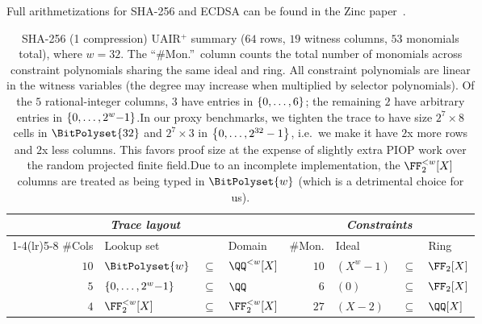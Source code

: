 Full arithmetizations for SHA-256 and ECDSA can be found in the Zinc paper~\cite{Zinc}.

\begin{table}[H]
\centering
\begin{tabular}{rl@{\;}c@{\;}l|rl@{\;}c@{\;}l}
\toprule
\multicolumn{4}{c|}{\emph{Trace layout}} & \multicolumn{4}{c}{\emph{Constraints}} \\
\cmidrule(lr){1-4}\cmidrule(lr){5-8}
\#Cols & Lookup set & & Domain & \#Mon. & Ideal & & Ring\\
\midrule
$10$ & $\BitPolyset{w}$ & $\subseteq$ & $\QQ^{<w}[X]$
& $10$ & $(X^w{-}1)$ & $\subseteq$ & $\FF_2[X]$ \\
$5$ & $\range{0}{2^w{-}1}$ & $\subseteq$ & $\QQ$
& $6$ & $(0)$ & $\subseteq$ & $\FF_2[X]$ \\
$4$ & $\FF_2^{<w}[X]$ & $\subseteq$ & $\FF_2^{<w}[X]$
& $27$ & $(X{-}2)$ & $\subseteq$ & $\QQ[X]$ \\
\bottomrule
\end{tabular}
\caption{SHA-256 (1 compression) UAIR${}^+$ summary ($64$ rows, $19$ witness columns, $53$ monomials total), where $w=32$. The ``\#Mon.''\ column counts the total number of monomials across constraint polynomials sharing the same ideal and ring. All constraint polynomials are linear in the witness variables (the degree may increase when multiplied by selector polynomials). Of the $5$ rational-integer columns, $3$ have entries in $\range{0}{6}$; the remaining $2$ have arbitrary entries in $\range{0}{2^w{-}1}$.\newline In our proxy benchmarks, we tighten the trace to have size $2^7 \times 8$ cells in $\BitPolyset{32}$ and $2^7 \times 3$ in $\range{0}{2^{32}-1}$, i.e.\ we make it have $2$x more rows and $2$x less columns. This favors proof size at the expense of slightly extra PIOP work over the random projected finite field.\newline Due to an incomplete implementation, the $\FF_2^{<w}[X]$ columns are treated as being typed in $\BitPolyset{w}$ (which is a detrimental choice for us).}
\label{tab:sha256_intro_summary}
\end{table}

